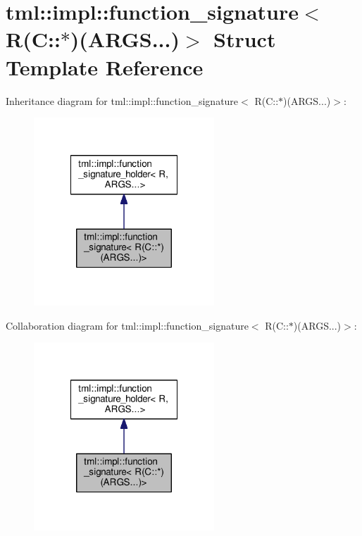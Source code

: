 \hypertarget{structtml_1_1impl_1_1function__signature_3_01_r_07_c_1_1_5_08_07_a_r_g_s_8_8_8_08_4}{\section{tml\+:\+:impl\+:\+:function\+\_\+signature$<$ R(C\+:\+:$\ast$)(A\+R\+G\+S...)$>$ Struct Template Reference}
\label{structtml_1_1impl_1_1function__signature_3_01_r_07_c_1_1_5_08_07_a_r_g_s_8_8_8_08_4}
}


Inheritance diagram for tml\+:\+:impl\+:\+:function\+\_\+signature$<$ R(C\+:\+:$\ast$)(A\+R\+G\+S...)$>$\+:
\nopagebreak
\begin{figure}[H]
\begin{center}
\leavevmode
\includegraphics[width=192pt]{structtml_1_1impl_1_1function__signature_3_01_r_07_c_1_1_5_08_07_a_r_g_s_8_8_8_08_4__inherit__graph}
\end{center}
\end{figure}


Collaboration diagram for tml\+:\+:impl\+:\+:function\+\_\+signature$<$ R(C\+:\+:$\ast$)(A\+R\+G\+S...)$>$\+:
\nopagebreak
\begin{figure}[H]
\begin{center}
\leavevmode
\includegraphics[width=192pt]{structtml_1_1impl_1_1function__signature_3_01_r_07_c_1_1_5_08_07_a_r_g_s_8_8_8_08_4__coll__graph}
\end{center}
\end{figure}
